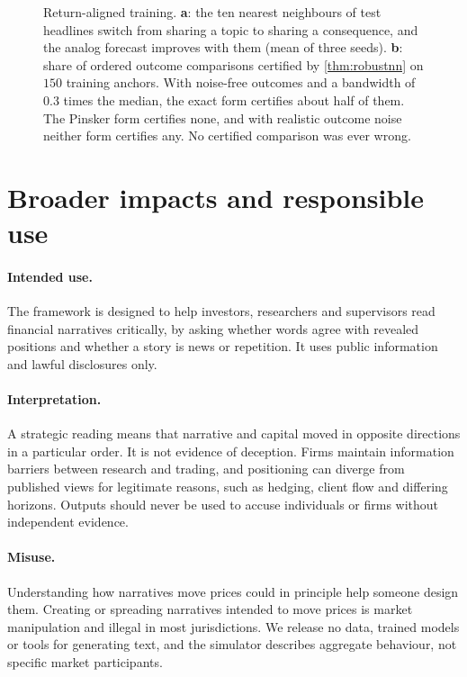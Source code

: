\documentclass{article}
\theoremstyle{plain}
\theoremstyle{definition}
\theoremstyle{remark}
\begin{document}
\begin{figure}[ht]
\begin{minipage}[t]{0.48\textwidth}
\end{minipage}
\caption{Return-aligned training. \textbf{a}: the ten nearest neighbours of test headlines switch from sharing a topic to sharing a consequence, and the analog forecast improves with them (mean of three seeds). \textbf{b}: share of ordered outcome comparisons certified by \cref{thm:robustnn} on $150$ training anchors. With noise-free outcomes and a bandwidth of $0.3$ times the median, the exact form certifies about half of them. The Pinsker form certifies none, and with realistic outcome noise neither form certifies any. No certified comparison was ever wrong.}
\label{fig:text}
\end{figure}

\section{Broader impacts and responsible use}\label{app:impact}

\paragraph{Intended use.} The framework is designed to help investors, researchers and supervisors read financial narratives critically, by asking whether words agree with revealed positions and whether a story is news or repetition. It uses public information and lawful disclosures only.

\paragraph{Interpretation.} A strategic reading means that narrative and capital moved in opposite directions in a particular order. It is not evidence of deception. Firms maintain information barriers between research and trading, and positioning can diverge from published views for legitimate reasons, such as hedging, client flow and differing horizons. Outputs should never be used to accuse individuals or firms without independent evidence.

\paragraph{Misuse.} Understanding how narratives move prices could in principle help someone design them. Creating or spreading narratives intended to move prices is market manipulation and illegal in most jurisdictions. We release no data, trained models or tools for generating text, and the simulator describes aggregate behaviour, not specific market participants.
\end{document}
